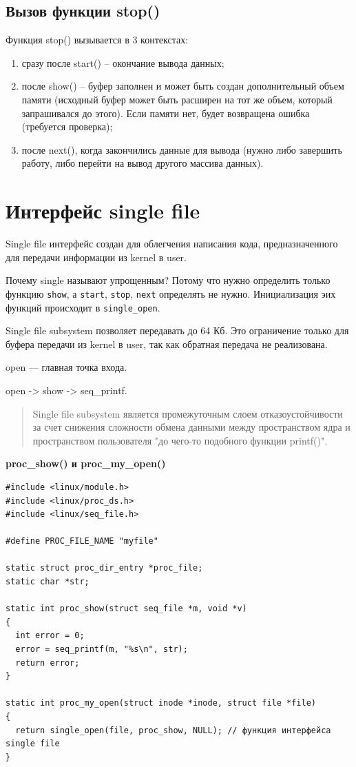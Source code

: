 \subsection{Вызов функции stop()}

Функция stop() вызывается в 3 контекстах:
\begin{enumerate}
\item сразу после start()  -- окончание вывода данных;
\item после show() -- буфер заполнен и может быть создан дополнительный объем памяти (исходный буфер может быть расширен на тот же объем, который запрашивался до этого). Если памяти нет, будет возвращена ошибка (требуется проверка);
\item после next(), когда закончились данные для вывода (нужно либо завершить работу, либо перейти на вывод другого массива данных).
\end{enumerate}

\section{Интерфейс single file}

Single file интерфейс создан для облегчения написания кода, предназначенного для передачи информации из kernel в user.

Почему single называют упрощенным? Потому что нужно определить только функцию \texttt{show}, а \texttt{start}, \texttt{stop}, \texttt{next} определять не нужно. Инициализация эих функций происходит в \texttt{single\_open}.

Single file subsystem позволяет передавать до 64 Кб. Это ограничение только для буфера передачи из kernel в user, так как обратная передача не реализована.

open --- главная точка входа.

open -> show -> seq\_printf.

\begin{quote}
Single file subsystem является промежуточным слоем отказоустойчивости за счет снижения сложности обмена данными между пространством ядра и пространством пользователя "до чего-то подобного функции printf()".
\end{quote}
\textbf{proc\_show() и proc\_my\_open()}

\begin{lstlisting}
#include <linux/module.h>
#include <linux/proc_ds.h>
#include <linux/seq_file.h>

#define PROC_FILE_NAME "myfile"

static struct proc_dir_entry *proc_file;
static char *str;

static int proc_show(struct seq_file *m, void *v)
{
  int error = 0;
  error = seq_printf(m, "%s\n", str);
  return error;
}

static int proc_my_open(struct inode *inode, struct file *file)
{
  return single_open(file, proc_show, NULL); // функция интерфейса single file
}
\end{lstlisting}

